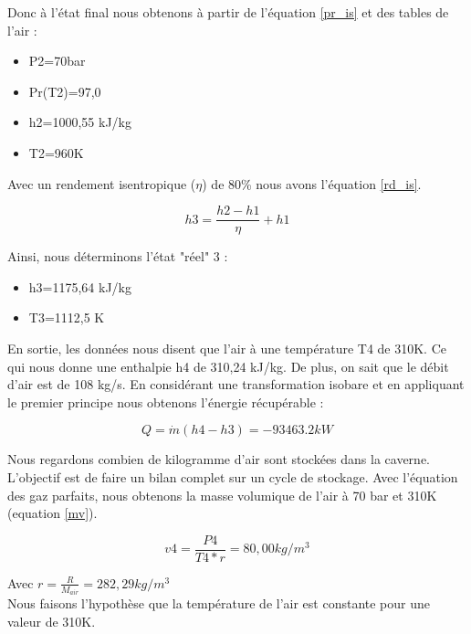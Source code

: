 Donc à l'état final nous obtenons à partir de l'équation \ref{pr_is} et des tables de l'air :
 
\begin{itemize}
\item P2=70bar
\item Pr(T2)=97,0
\item h2=1000,55 kJ/kg
\item T2=960K\\

\end{itemize}

Avec un rendement isentropique ($\eta$) de 80\% nous avons l'équation \ref{rd_is}.

\begin{equation}
h3=\frac{h2-h1}{\eta}+h1
\label{rd_is}
\end{equation}

Ainsi, nous déterminons l'état "réel" 3 :

\begin{itemize}
\item h3=1175,64 kJ/kg
\item T3=1112,5 K\\

\end{itemize}



En sortie, les données nous disent que l'air à une température T4 de 310K. Ce qui nous donne une enthalpie h4 de 310,24 kJ/kg. De plus, on sait que le débit d'air est de 108 kg/s.
En considérant une transformation isobare et en appliquant le premier principe nous obtenons l'énergie récupérable :

\begin{equation}
Q=\dot{m}(h4-h3) = -93463.2 kW
\label{cha_recup}
\end{equation}


Nous regardons combien de kilogramme d'air sont stockées dans la caverne. L'objectif est de faire un bilan complet sur un cycle de stockage. 
Avec l'équation des gaz parfaits, nous obtenons la masse volumique de l'air à 70 bar et 310K (equation \ref{mv}). 

\begin{equation}
v4=\frac{P4}{T4*r}=80,00 kg/m^{3}
\label{mv}
\end{equation}

Avec $r=\frac{R}{M_{air}}=282,29 kg/m^{3}$\\


Nous faisons l'hypothèse que la température de l'air est constante pour une valeur de 310K.

